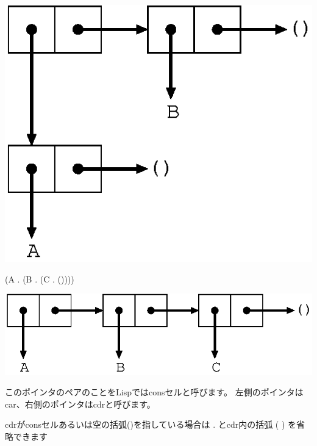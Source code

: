 \documentclass[mingoth,a4paper]{jsarticle}
\begin{document}
\includegraphics[scale=0.5]{image200903/pairs.eps}

\begin{commandline}
(A . (B . (C . ())))
\end{commandline}

\includegraphics[scale=0.5]{image200903/lpair.eps}

このポインタのペアのことをLispではconsセルと呼びます。
左側のポインタはcar、右側のポインタはcdrと呼びます。

cdrがconsセルあるいは空の括弧()を指している場合は . とcdr内の括弧 ( ) を省略できます
\end{document}
